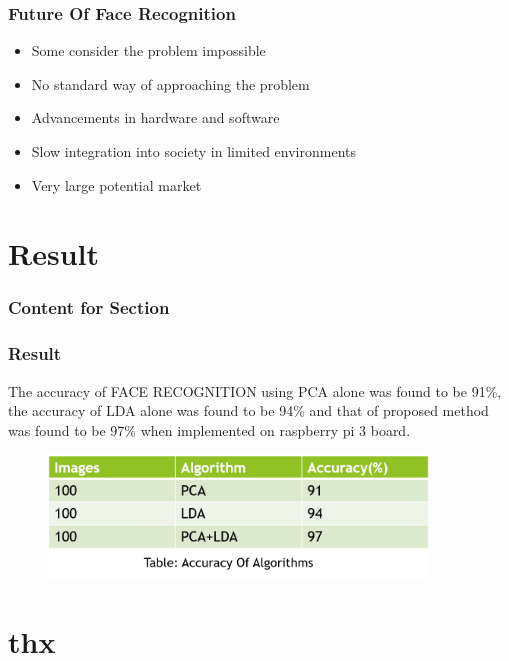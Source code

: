 \documentclass[xcolor=dvipsnames]{beamer}
\newenvironment{reference}[2]{
  \begin{textblock*}{\textwidth}(#1,#2)
     \bgroup\fontsize{6pt}{\baselineskip}\selectfont\color[RGB]{0,112,192}}{\egroup\end{textblock*}}
\begin{document}
     \begin{frame}
    \frametitle{Future Of Face Recognition}
    \begin{itemize}
    \item Some consider the problem impossible
    \item No standard way of approaching the problem
    \item Advancements in hardware and software
    \item Slow integration into society in limited environments
    \item Very large potential market  
    \end{itemize}
    \end{frame}
    
    \section{Result}	
    \begin{frame}
      \frametitle{Content for Section \thesection}
      \tableofcontents[currentsection]
    \end{frame}
    
    \begin{frame}
    \frametitle{Result}
    The accuracy of FACE RECOGNITION using PCA alone was found to be 91\%, the accuracy of LDA alone was found to be 94\% and that of proposed method was found to be 97\% when implemented on raspberry pi 3 board. 
    \begin{figure}[H]
        \graphicspath{{figs/}}
        \includegraphics[width=0.9\textwidth]{img7.png}
    \end{figure}
    \end{frame}
    
    \section*{thx}
        \begin{frame}
        \begin{center}
        \fontsize{30pt}{\baselineskip}\selectfont {}
        \end{center}
        \begin{reference}{0mm}{80mm}
        \end{reference}
        \end{frame}
\end{document}
